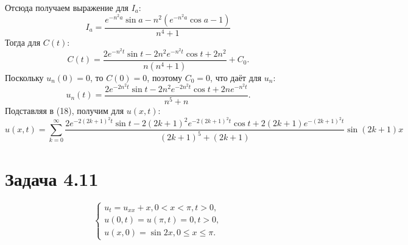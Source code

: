 \documentclass[11pt]{article}
\begin{document}
Отсюда получаем выражение для $I_a$:
\begin{equation*}
I_a = \frac{e^{-n^2a}\sin a - n^2(e^{-n^2a}\cos a - 1)}{n^4 + 1}
\end{equation*}
Тогда для $C(t)$:
\begin{equation}
C(t) = \frac{2e^{-n^2t}\sin t - 2n^2e^{-n^2t}\cos t + 2n^2}{n(n^4 + 1)} + C_0.
\end{equation}
Поскольку $u_n(0) = 0$, то $C(0) = 0$, поэтому $C_0 = 0$, что даёт для $u_n$:
\begin{equation}
u_n(t) = \frac{2e^{-2n^2t}\sin t - 2n^2e^{-2n^2t}\cos t + 2ne^{-n^2t}}{n^5 + n}.
\end{equation}
Подставляя в (18), получим для $u(x, t)$:
\begin{equation}
u(x, t) = \sum_{k = 0}^{\infty}\frac{2e^{-2(2k + 1)^2t}\sin t - 2(2k + 1)^2e^{-2(2k + 1)^2t}\cos t + 2(2k + 1)e^{-(2k + 1)^2t}}{(2k + 1)^5 + (2k + 1)}\sin(2k + 1)x
\end{equation}
\section{Задача 4.11}
\label{sec:org2261108}
\begin{equation}
\begin{cases}
u_t = u_{xx} + x, 0 < x < \pi, t > 0, \\
u(0, t) = u(\pi, t) = 0, t > 0, \\
u(x, 0) = \sin 2x, 0 \leq x \leq \pi.
\end{cases}
\end{equation}
\end{document}
